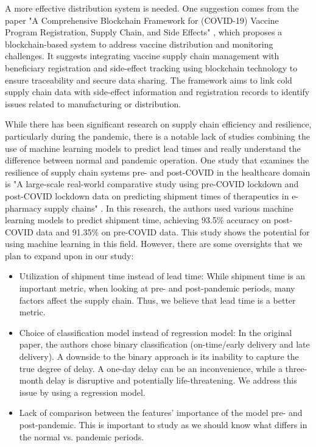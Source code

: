 \documentclass[12pt]{report}
\begin{document}
\begin{itemize}
  A more effective distribution system is needed. One suggestion comes from the paper "A Comprehensive Blockchain Framework for (COVID-19) Vaccine Program Registration, Supply Chain, and Side Effects" \cite{BlockchainCovid19Vacc}, which proposes a blockchain-based system to address vaccine distribution and monitoring challenges. It suggests integrating vaccine supply chain management with beneficiary registration and side-effect tracking using blockchain technology to ensure traceability and secure data sharing. The framework aims to link cold supply chain data with side-effect information and registration records to identify issues related to manufacturing or distribution.
\end{itemize}

While there has been significant research on supply chain efficiency and resilience, particularly during the pandemic, there is a notable lack of studies combining the use of machine learning models to predict lead times and really understand the difference between normal and pandemic operation. One study that examines the resilience of supply chain systems pre- and post-COVID in the healthcare domain is "A large-scale real-world comparative study using pre-COVID lockdown and post-COVID lockdown data on predicting shipment times of therapeutics in e-pharmacy supply chains" \cite{pre-postCovid-study}. In this research, the authors used various machine learning models to predict shipment time, achieving 93.5\% accuracy on post-COVID data and 91.35\% on pre-COVID data. This study shows the potential for using machine learning in this field. However, there are some oversights that we plan to expand upon in our study:

\begin{itemize}
  \item Utilization of shipment time instead of lead time: While shipment time is an important metric, when looking at pre- and post-pandemic periods, many factors affect the supply chain. Thus, we believe that lead time is a better metric.
  \item Choice of classification model instead of regression model: In the original paper, the authors chose binary classification (on-time/early delivery and late delivery). A downside to the binary approach is its inability to capture the true degree of delay. A one-day delay can be an inconvenience, while a three-month delay is disruptive and potentially life-threatening. We address this issue by using a regression model.
  \item Lack of comparison between the features' importance of the model pre- and post-pandemic. This is important to study as we should know what differs in the normal vs. pandemic periods.
\end{itemize}
\end{document}
